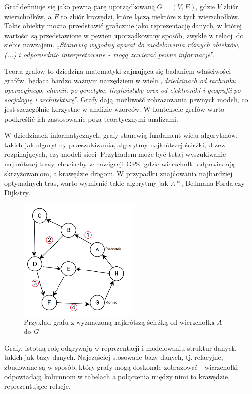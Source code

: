 Graf definiuje się jako pewną parę uporządkowaną $G = (V, E)$, gdzie $V$ zbiór wierzchołków,
a $E$ to zbiór krawędzi, które łączą niektóre z tych wierzchołków.
Takie obiekty mozna przedstawić graficznie jako reprezentację danych,
w której wartości są przedstawione w pewien uporządkowany sposób, zwykle w relacji do siebie nawzajem.
„\textit{Stanowią wygodny aparat do modelowania różnych obiektów, (...) i odpowiednio interpretowane
- mogą zawierać pewne informacje}”\cite{Wloch2008}.

Teoria grafów to dziedzina matematyki zajmująca się badaniem właściwości grafów,
będąca bardzo ważnym narzędziem w wielu „\textit{dziedzinach od rachunku operacyjnego, chemii, po genetykę, lingiwistykę
oraz od elektroniki i geografii po socjologię i architekturę}”\cite{Wilson2012}.
Grafy dają możliwość zobrazowania pewnych modeli, co jest szczególnie korzystne w analizie wzorców.
W kontekście grafów warto podkreślić ich zastosowanie poza teoretycznymi analizami.

W dziedzinach informatycznych, grafy stanowią fundament wielu algorytmów, takich jak algorytmy przeszukiwania,
algorytmy najkrótszej ścieżki, drzew rozpinających, czy modeli sieci.
Przykładem może być tutaj wyszukiwanie najkrótszej trasy, chociażby w nawigacji GPS,
gdzie wierzchołki odpowiadają skrzyżowaniom, a krawędzie drogom.
W przypadku znajdowania najbardziej optymalnych tras, warto wymienić takie algorytmy jak $A*$, Bellmana-Forda czy Dijkstry.

\begin{figure}[ht]
	\centering
	\includegraphics[height=6cm]{partials/images/intro_shortest_path.png}
	\caption{Przykład grafu z wyznaczoną najkrótszą ścieżką od wierzchołka $A$ do $G$}
    \label{Fig:intro-1}
\end{figure}

Grafy, istotną rolę odgrywają w reprezentacji i modelowaniu struktur danych, takich jak bazy danych.
Najczęściej stosowane bazy danych, tj. relacyjne, zbudowane są w sposób, który grafy mogą doskonale zobrazować -
wierzchołki odpowiadają kolumnom w tabelach a połączenia między nimi to krawędzie, reprezentujące relacje.

